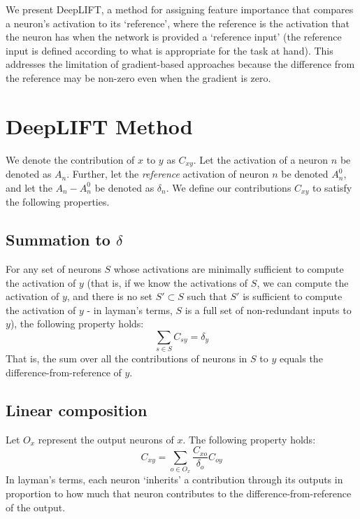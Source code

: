 \documentclass{article}
\begin{document}
We present DeepLIFT, a method for assigning feature importance that compares a neuron's activation to its `reference', where the reference is the activation that the neuron has when the network is provided a `reference input' (the reference input is defined according to what is appropriate for the task at hand). This addresses the limitation of gradient-based approaches because the difference from the reference may be non-zero even when the gradient is zero.

\vspace{-10px}
\section{DeepLIFT Method}
\label{DeepLIFT}

We denote the contribution of $x$ to $y$ as $C_{xy}$. Let the activation of a neuron $n$ be denoted as $A_n$. Further, let the \emph{reference} activation of neuron $n$ be denoted $A_n^0$, and let the $A_n - A_n^0$ be denoted as $\delta_n$. We define our contributions $C_{xy}$ to satisfy the following properties.

\vspace{-5px}
\subsection{Summation to $\delta$}

For any set of neurons $S$ whose activations are minimally sufficient to compute the activation of $y$ (that is, if we know the activations of $S$, we can compute the activation of $y$, and there is no set $S' \subset S$ such that $S'$ is sufficient to compute the activation of $y$ - in layman's terms, $S$ is a full set of non-redundant inputs to $y$), the following property holds:
\begin{equation}
\sum_{s \in S} C_{sy} = \delta_y
\end{equation}
That is, the sum over all the contributions of neurons in $S$ to $y$ equals the difference-from-reference of $y$.

\subsection{Linear composition}

Let $O_x$ represent the output neurons of $x$. The following property holds:\\
\begin{equation}
C_{xy} = \sum_{o \in O_x} \frac{C_{xo}}{\delta_o}C_{oy}
\end{equation}
In layman's terms, each neuron `inherits' a contribution through its outputs in proportion to how much that neuron contributes to the difference-from-reference of the output.
\end{document}
